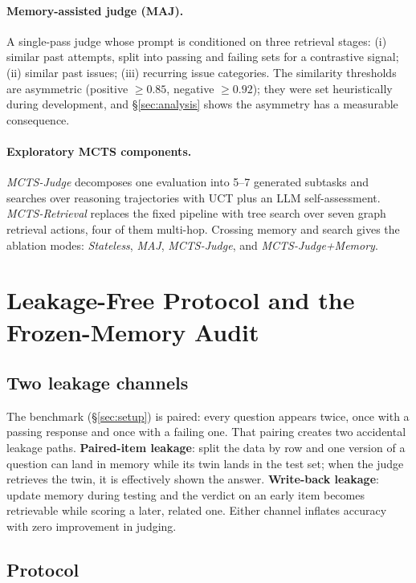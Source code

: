 \documentclass[11pt]{article}
\begin{document}
\paragraph{Memory-assisted judge (MAJ).} A single-pass judge whose prompt is conditioned on three retrieval stages: (i) similar past attempts, split into passing and failing sets for a contrastive signal; (ii) similar past issues; (iii) recurring issue categories. The similarity thresholds are asymmetric (positive $\ge 0.85$, negative $\ge 0.92$); they were set heuristically during development, and \S\ref{sec:analysis} shows the asymmetry has a measurable consequence.

\paragraph{Exploratory MCTS components.} \emph{MCTS-Judge} decomposes one evaluation into 5--7 generated subtasks and searches over reasoning trajectories with UCT plus an LLM self-assessment. \emph{MCTS-Retrieval} replaces the fixed pipeline with tree search over seven graph retrieval actions, four of them multi-hop. Crossing memory and search gives the ablation modes: \emph{Stateless}, \emph{MAJ}, \emph{MCTS-Judge}, and \emph{MCTS-Judge+Memory}.

\section{Leakage-Free Protocol and the Frozen-Memory Audit}
\label{sec:protocol}

\subsection{Two leakage channels}

The benchmark (\S\ref{sec:setup}) is paired: every question appears twice, once with a passing response and once with a failing one. That pairing creates two accidental leakage paths. \textbf{Paired-item leakage}: split the data by row and one version of a question can land in memory while its twin lands in the test set; when the judge retrieves the twin, it is effectively shown the answer. \textbf{Write-back leakage}: update memory during testing and the verdict on an early item becomes retrievable while scoring a later, related one. Either channel inflates accuracy with zero improvement in judging.

\subsection{Protocol}
\end{document}
